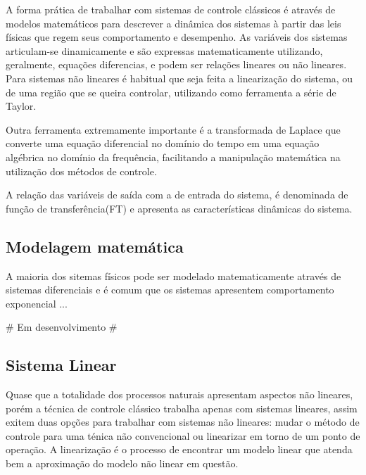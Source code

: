 A forma prática de trabalhar com sistemas de controle clássicos é através de modelos matemáticos para descrever a dinâmica dos sistemas à partir das leis físicas que regem seus comportamento e desempenho.
As variáveis dos sistemas articulam-se dinamicamente e são expressas matematicamente utilizando, geralmente, equações diferencias, e podem ser relações lineares ou não lineares. Para sistemas não lineares é habitual que seja feita a linearização do sistema, ou de uma região que se queira controlar, utilizando como ferramenta a série de Taylor. 

Outra ferramenta extremamente importante é a transformada de Laplace que converte uma equação diferencial no domínio do tempo em uma equação algébrica no domínio da frequência, facilitando a manipulação matemática na utilização dos métodos de controle. 

A relação das variáveis de saída com a de entrada do sistema, é denominada de função de transferência(FT) e apresenta as características dinâmicas do sistema.



\subsection{Modelagem matemática}

A maioria dos sitemas físicos pode ser modelado matematicamente através de sistemas diferenciais e é comum que os sistemas apresentem comportamento exponencial ...

\# Em desenvolvimento \#



\subsection{Sistema Linear}

Quase que a totalidade dos processos naturais apresentam aspectos não lineares, porém a técnica de controle clássico trabalha apenas com sistemas lineares, assim exitem duas opções para trabalhar com sistemas não lineares: mudar o método de controle para uma ténica não convencional ou linearizar em torno de um ponto de operação. A linearização é o processo de encontrar um modelo linear que atenda bem a aproximação do modelo não linear em questão.

